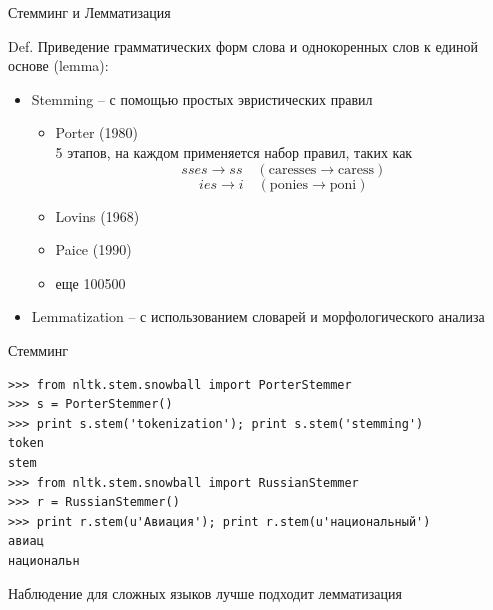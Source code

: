 \documentclass[10pt,a4paper]{beamer}
\begin{document}

\begin{frame}{Стемминг и Лемматизация}

\begin{block}{Def.}
Приведение грамматических форм слова и однокоренных слов к единой основе (lemma): 
\begin{itemize}
\item Stemming -- с помощью простых эвристических правил
\begin{itemize}
\item Porter (1980) \\
5 этапов, на каждом применяется набор правил, таких как
\[
sses \rightarrow ss \quad (\text{caresses}\rightarrow\text{caress})
\]
\[
ies \rightarrow i \quad (\text{ponies}\rightarrow\text{poni})
\]
\item Lovins (1968)
\item Paice (1990)
\item еще 100500
\end{itemize}
\item Lemmatization -- с использованием словарей и морфологического анализа
\end{itemize}
\end{block}

\end{frame}


\begin{frame}[fragile]{Стемминг}

\begin{shaded}
{\color{green}
\begin{verbatim}
>>> from nltk.stem.snowball import PorterStemmer
>>> s = PorterStemmer()
>>> print s.stem('tokenization'); print s.stem('stemming')
token
stem
>>> from nltk.stem.snowball import RussianStemmer
>>> r = RussianStemmer()
>>> print r.stem(u'Авиация'); print r.stem(u'национальный')
авиац
национальн
\end{verbatim}}
\end{shaded}

\begin{block}{Наблюдение}
для сложных языков лучше подходит лемматизация
\end{block}

\end{frame}

\end{document}

